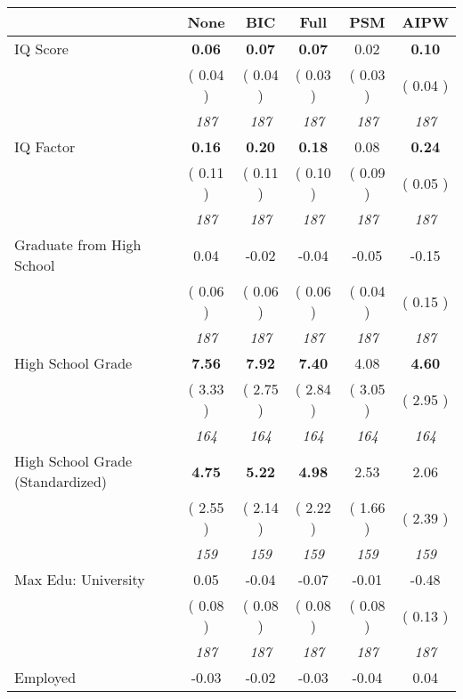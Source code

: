 \begin{tabular}{l c c c c c}
\toprule
 & None & BIC & Full & PSM & AIPW \\
\midrule
IQ Score & \textbf{      0.06 } & \textbf{      0.07 } & \textbf{      0.07 } &      0.02 & \textbf{     0.10} \\
& (     0.04 ) & (     0.04 ) & (     0.03 ) & (     0.03 ) & (     0.04 ) \\
& \textit{ 187 } & \textit{ 187 } & \textit{ 187 } & \textit{ 187 } & \textit{ 187 } \\
IQ Factor & \textbf{      0.16 } & \textbf{      0.20 } & \textbf{      0.18 } &      0.08 & \textbf{     0.24} \\
& (     0.11 ) & (     0.11 ) & (     0.10 ) & (     0.09 ) & (     0.05 ) \\
& \textit{ 187 } & \textit{ 187 } & \textit{ 187 } & \textit{ 187 } & \textit{ 187 } \\
Graduate from High School &      0.04 &     -0.02 &     -0.04 &     -0.05 &     -0.15 \\
& (     0.06 ) & (     0.06 ) & (     0.06 ) & (     0.04 ) & (     0.15 ) \\
& \textit{ 187 } & \textit{ 187 } & \textit{ 187 } & \textit{ 187 } & \textit{ 187 } \\
High School Grade & \textbf{      7.56 } & \textbf{      7.92 } & \textbf{      7.40 } &      4.08 & \textbf{     4.60} \\
& (     3.33 ) & (     2.75 ) & (     2.84 ) & (     3.05 ) & (     2.95 ) \\
& \textit{ 164 } & \textit{ 164 } & \textit{ 164 } & \textit{ 164 } & \textit{ 164 } \\
High School Grade (Standardized) & \textbf{      4.75 } & \textbf{      5.22 } & \textbf{      4.98 } &      2.53 &      2.06 \\
& (     2.55 ) & (     2.14 ) & (     2.22 ) & (     1.66 ) & (     2.39 ) \\
& \textit{ 159 } & \textit{ 159 } & \textit{ 159 } & \textit{ 159 } & \textit{ 159 } \\
Max Edu: University &      0.05 &     -0.04 &     -0.07 &     -0.01 &     -0.48 \\
& (     0.08 ) & (     0.08 ) & (     0.08 ) & (     0.08 ) & (     0.13 ) \\
& \textit{ 187 } & \textit{ 187 } & \textit{ 187 } & \textit{ 187 } & \textit{ 187 } \\
Employed &     -0.03 &     -0.02 &     -0.03 &     -0.04 &      0.04 \\

\end{tabular}
